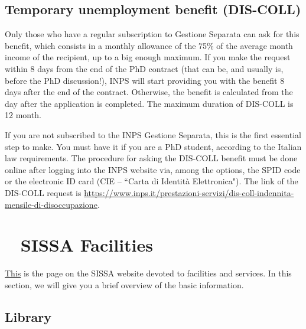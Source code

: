 \documentclass{sissavademecum}
\begin{document}
\section{Temporary unemployment benefit (DIS-COLL) }

Only those who have a regular subscription to Gestione Separata can ask for this benefit, which consists in a monthly allowance of the 75\% of the average month income of the recipient, up to a big enough maximum. If you make the request within 8 days from the end of the PhD contract (that can be, and usually is, before the PhD discussion!), INPS will start providing you with the benefit 8 days after the end of the contract. Otherwise, the benefit is calculated from the day after the application is completed. The maximum duration of DIS-COLL is 12 month.

If you are not subscribed to the INPS Gestione Separata, this is the first essential step to make. You must have it if you are a PhD student, according to the Italian law requirements. The procedure for asking the DIS-COLL benefit must be done online after logging into the INPS website via, among the options, the SPID code or the electronic ID card (CIE -- ``Carta di Identità Elettronica"). The link of the DIS-COLL request is \href{https://www.inps.it/prestazioni-servizi/dis-coll-indennita-mensile-di-disoccupazione}{https://www.inps.it/prestazioni-servizi/dis-coll-indennita-mensile-di-disoccupazione}.




\chapter{\texorpdfstring{\faUniversity\ }{} SISSA Facilities}

\href{https://www.sissa.it/facilities-and-services}{This} is the page on the SISSA website devoted to facilities and services. In this section, we will give you a brief overview of the basic information.


\section{Library}\label{sec:Library}
\end{document}
